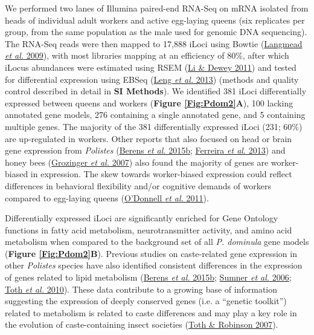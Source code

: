 We performed two lanes of Illumina paired-end RNA-Seq on mRNA isolated
from heads of individual adult workers and active egg-laying queens (six
replicates per group, from the same population as the male used for
genomic DNA sequencing). The RNA-Seq reads were then mapped to 17,888
iLoci using Bowtie (\protect\hyperlink{ux5fENREFux5f29}{Langmead
\textit{et al.} 2009}), with most libraries mapping at an efficiency of
80\%, after which iLocus abundances were estimated using RSEM
(\protect\hyperlink{ux5fENREFux5f31}{Li \& Dewey 2011}) and tested for
differential expression using EBSeq
(\protect\hyperlink{ux5fENREFux5f30}{Leng \textit{et al.} 2013}) (methods
and quality control described in detail in \textbf{SI Methods}). We
identified 381 iLoci differentially expressed between queens and workers
(\textbf{Figure \ref{Fig:Pdom2}A}), 100 lacking annotated gene models, 276 containing
a single annotated gene, and 5 containing multiple genes. The majority
of the 381 differentially expressed iLoci (231; 60\%) are up-regulated
in workers. Other reports that also focused on head or brain gene
expression from \textit{Polistes}
(\protect\hyperlink{ux5fENREFux5f3}{Berens \textit{et al.} 2015b};
\protect\hyperlink{ux5fENREFux5f10}{Ferreira \textit{et al.} 2013}) and
honey bees (\protect\hyperlink{ux5fENREFux5f16}{Grozinger \textit{et al.}
2007}) also found the majority of genes are worker-biased in expression.
The skew towards worker-biased expression could reflect differences in
behavioral flexibility and/or cognitive demands of workers compared to
egg-laying queens (\protect\hyperlink{ux5fENREFux5f38}{O'Donnell
\textit{et al.} 2011}).

Differentially expressed iLoci are significantly enriched for Gene
Ontology functions in fatty acid metabolism, neurotransmitter activity,
and amino acid metabolism when compared to the background set of all
\textit{P. dominula} gene models (\textbf{Figure \ref{Fig:Pdom2}B}). Previous studies on
caste-related gene expression in other \textit{Polistes} species have also
identified consistent differences in the expression of genes related to
lipid metabolism (\protect\hyperlink{ux5fENREFux5f3}{Berens \textit{et
al.} 2015b}; \protect\hyperlink{ux5fENREFux5f59}{Sumner \textit{et al.}
2006}; \protect\hyperlink{ux5fENREFux5f62}{Toth \textit{et al.} 2010}).
These data contribute to a growing base of information suggesting the
expression of deeply conserved genes (i.e. a ``genetic toolkit'')
related to metabolism is related to caste differences and may play a key
role in the evolution of caste-containing insect societies
(\protect\hyperlink{ux5fENREFux5f61}{Toth \& Robinson 2007}).

